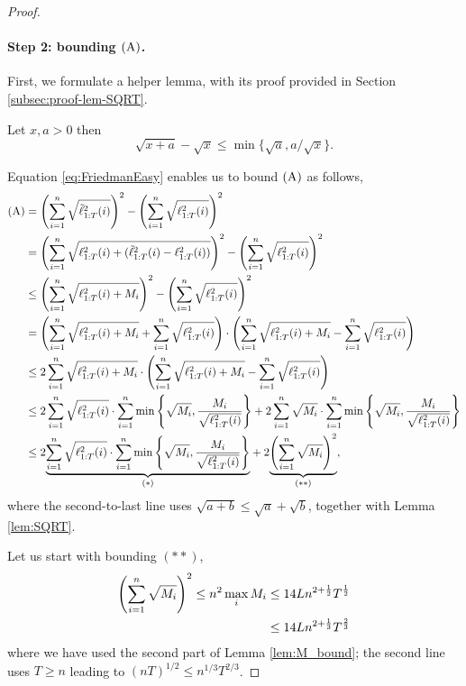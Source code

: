\begin{proof}
\paragraph{Step 2: bounding $\rA$.} 
First, we formulate a helper lemma, with its proof provided in Section \ref{subsec:proof-lem-SQRT}.
\begin{lemma}\label{lem:SQRT}
Let $x,a > 0$ then
$$
\sqrt{x+a} - \sqrt{x} \leq \min\{\sqrt{a}, a/\sqrt{x} \}.
$$
\end{lemma}

Equation \eqref{eq:FriedmanEasy} enables us to bound $\rA$ as follows,
\begin{align} \label{eq:BoundC}
\rA
 &=
 \left(\sumin \sqrt{\tell_{1:T}^2(i)}  \right)^2 -  \left(\sumin \sqrt{\ell_{1:T}^2(i)}  \right)^2  \nonumber\\
  &=
 \left(\sumin \sqrt{\ell_{1:T}^2(i)+(\tell_{1:T}^2(i)-\ell_{1:T}^2(i))}  \right)^2 -  \left(\sumin \sqrt{\ell_{1:T}^2(i)}  \right)^2   \nonumber\\
 &\leq
 \left(\sumin \sqrt{\ell_{1:T}^2(i)+M_i}  \right)^2 -  \left(\sumin \sqrt{\ell_{1:T}^2(i)}  \right)^2   \nonumber\\
&=
 \left(\sumin \sqrt{\ell_{1:T}^2(i)+M_i}  +\sumin \sqrt{\ell_{1:T}^2(i)}  \right)
 \cdot
 \left(\sumin \sqrt{\ell_{1:T}^2(i)+M_i}  - \sumin \sqrt{\ell_{1:T}^2(i)}  \right)  \nonumber\\
 &\leq
2\sumin \sqrt{\ell_{1:T}^2(i)+M_i} 
 \cdot
 \left(\sumin \sqrt{\ell_{1:T}^2(i)+M_i}  - \sumin \sqrt{\ell_{1:T}^2(i)}  \right)  \nonumber\\
 &\leq
2\sumin \sqrt{\ell_{1:T}^2(i)} 
 \cdot
  \sumin \min\left\{ \sqrt{M_i} , \frac{M_i}{\sqrt{\ell_{1:T}^2(i)}} \right\}
  +
  2\sumin \sqrt{M_i} 
 \cdot
  \sumin \min\left\{ \sqrt{M_i} , \frac{M_i}{\sqrt{\ell_{1:T}^2(i)}} \right\} \nonumber\\
  &\leq
2\uann{\sumin \sqrt{\ell_{1:T}^2(i)} 
 \cdot
  \sumin \min\left\{ \sqrt{M_i} , \frac{M_i}{\sqrt{\ell_{1:T}^2(i)}} \right\}}{(*)}
  +
  2\uann{\left(\sumin \sqrt{M_i} \right)^2}{(**)},
\end{align}
where the second-to-last  line uses  $\sqrt{a+b} \leq \sqrt{a}+\sqrt{b}$, together with Lemma \ref{lem:SQRT}. 

Let us start with bounding $(**)$,
\begin{align} \label{eq:exp-regret-2nd-term}
 \left( \sum_{i=1}^n \sqrt{M_i}  \right)^2
  \leq n^2 \max_{i}M_i 
  &\leq 14 L n^{2 + \frac{1}{2}} T^{\frac{1}{2}} \nonumber\\
  &\leq 14 L n^{2 + \frac{1}{3}} T^{\frac{2}{3}}
\end{align}
where we have used the second part  of Lemma \ref{lem:M_bound}; the second line uses $T\geq n$ leading to \linebreak
$(nT)^{1/2}\leq n^{1/3}T^{2/3}$.


\end{proof}

